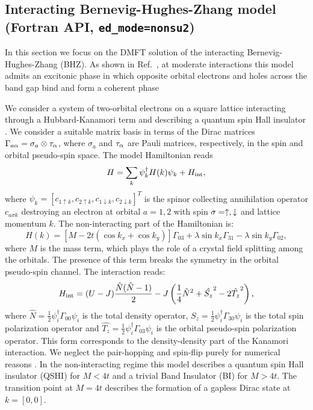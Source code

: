 \documentclass[edipack_sp.tex]{subfiles}
\begin{document}
\subsection{Interacting Bernevig-Hughes-Zhang model (Fortran API, {\tt ed\_mode=nonsu2})}
In this section we focus on the DMFT solution of the interacting
Bernevig-Hughes-Zhang (BHZ).
As shown in Ref.~\cite{Amaricci2023PR}, at moderate
interactions this model admits an excitonic phase in which opposite
orbital electrons and holes across the band gap bind and form a coherent phase \cite{Knolle2017PRL,Jia2020,Varsano2020NN,Blason,Amaricci2023PR,Giuli2023PRB}

We consider a system of two-orbital electrons on a square
lattice interacting through a Hubbard-Kanamori term and describing
a quantum spin Hall insulator \cite{Kane2005PRL,Bernevig2006S,Konig2007S,Hasan2010RMPa,Hohenadler2011PRL,Amaricci2015PRL,Tang2017NP,Amaricci2023PR,Paoletti2024PR}.
We consider a suitable matrix basis in terms of the Dirac
matrices $\Gamma_{a\alpha}=\sigma_a\otimes \tau_\alpha$, where $\sigma_a$ and
$\tau_\alpha$ are Pauli matrices, respectively, in the spin and orbital
pseudo-spin space. The  model Hamiltonian reads
$$
H = \sum_{k}\psi_{k}^\dagger H(k)\psi_{k} + H_{\rm int},
$$
where $\psi_{k}=[c_{1\uparrow k}, c_{2\uparrow k},
c_{1\downarrow k}, c_{2\downarrow k} ]^T$ is the spinor collecting
annihilation operator $c_{a\sigma k}$ destroying an electron at
orbital $a=1,2$ with spin  $\sigma=\uparrow,\downarrow$ and lattice momentum
$k$. The non-interacting part of the Hamiltonian is:
$$
H(k) = \left[M-2t(\cos{k_x}+\cos{k_y}) \right]\Gamma_{03} +
   \lambda\sin{k_x}\Gamma_{31} -   \lambda\sin{k_y}\Gamma_{02},
$$
where $M$ is the mass term, which plays the role of a crystal
field splitting among the orbitals. The presence of this term breaks
the symmetry in the orbital pseudo-spin channel.
The  interaction reads: 
$$
   H_{\rm int} = (U-J)\frac{\hat{N}(\hat{N}-1)}{2} - J\left( \frac{1}{4}\hat{N}^2 +
   \hat{S_z}^2 - 2 \hat{T_z}^2\right),
 $$
 where $\hat{N}=\tfrac{1}{2}\psi_i^\dagger \Gamma_{00}\psi_i$ is the
total density operator,
$\hat{S_z}=\tfrac{1}{2}\psi_i^\dagger \Gamma_{30}\psi_i$ is the total
spin polarization operator and $\hat{T_z}=\tfrac{1}{2}\psi_i^\dagger
\Gamma_{03}\psi_i$ is the orbital pseudo-spin polarization operator.
This form corresponds to the density-density part of the
Kanamori interaction. We neglect the pair-hopping and spin-flip purely
for numerical reasons \cite{Amaricci2022CPC}. 
%
In the non-interacting regime this model describes a
quantum spin Hall insulator (QSHI) for $M<4t$ and a trivial Band
Insulator (BI) for $M>4t$.
The transition point at $M=4t$ describes the formation of a gapless Dirac state at  $k=[0,0]$.  
\end{document}
